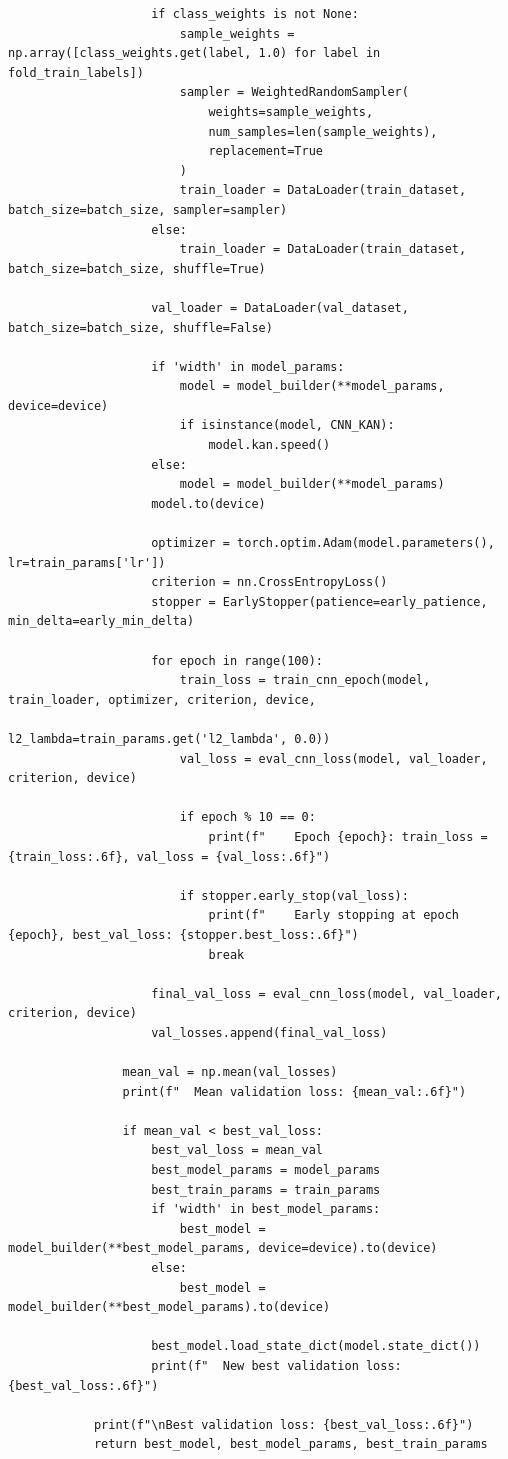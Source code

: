\documentclass[a4paper,12pt]{report}
\begin{document}
\begin{verbatim}
					if class_weights is not None:
						sample_weights = np.array([class_weights.get(label, 1.0) for label in fold_train_labels])
						sampler = WeightedRandomSampler(
							weights=sample_weights,
							num_samples=len(sample_weights),
							replacement=True
						)
						train_loader = DataLoader(train_dataset, batch_size=batch_size, sampler=sampler)
					else:
						train_loader = DataLoader(train_dataset, batch_size=batch_size, shuffle=True)
					
					val_loader = DataLoader(val_dataset, batch_size=batch_size, shuffle=False)
					
					if 'width' in model_params:
						model = model_builder(**model_params, device=device)
						if isinstance(model, CNN_KAN):
							model.kan.speed()
					else:
						model = model_builder(**model_params)
					model.to(device)
					
					optimizer = torch.optim.Adam(model.parameters(), lr=train_params['lr'])
					criterion = nn.CrossEntropyLoss()
					stopper = EarlyStopper(patience=early_patience, min_delta=early_min_delta)
					
					for epoch in range(100):
						train_loss = train_cnn_epoch(model, train_loader, optimizer, criterion, device,
												l2_lambda=train_params.get('l2_lambda', 0.0))
						val_loss = eval_cnn_loss(model, val_loader, criterion, device)
						
						if epoch % 10 == 0:
							print(f"    Epoch {epoch}: train_loss = {train_loss:.6f}, val_loss = {val_loss:.6f}")
						
						if stopper.early_stop(val_loss):
							print(f"    Early stopping at epoch {epoch}, best_val_loss: {stopper.best_loss:.6f}")
							break
					
					final_val_loss = eval_cnn_loss(model, val_loader, criterion, device)
					val_losses.append(final_val_loss)
				
				mean_val = np.mean(val_losses)
				print(f"  Mean validation loss: {mean_val:.6f}")
				
				if mean_val < best_val_loss:
					best_val_loss = mean_val
					best_model_params = model_params
					best_train_params = train_params
					if 'width' in best_model_params:
						best_model = model_builder(**best_model_params, device=device).to(device)
					else:
						best_model = model_builder(**best_model_params).to(device)
					
					best_model.load_state_dict(model.state_dict())
					print(f"  New best validation loss: {best_val_loss:.6f}")
			
			print(f"\nBest validation loss: {best_val_loss:.6f}")
			return best_model, best_model_params, best_train_params
	\end{verbatim}
	
\end{document}

